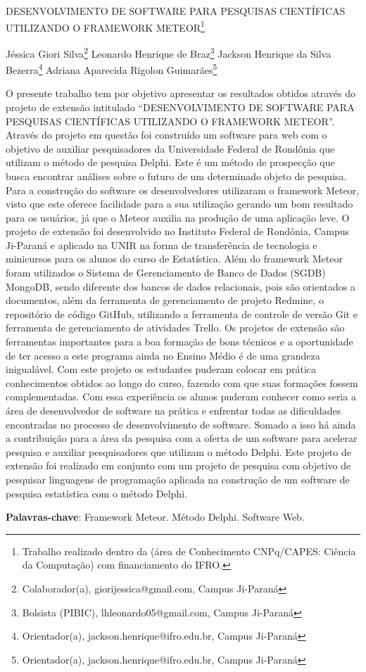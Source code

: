 \documentclass[article,12pt,onesidea,4paper,english,brazil]{abntex2}
\begin{document}
	
	
	\frenchspacing 
	
	\begin{center}
		\LARGE DESENVOLVIMENTO DE SOFTWARE PARA PESQUISAS CIENTÍFICAS UTILIZANDO O FRAMEWORK METEOR\footnote{Trabalho realizado dentro da (área de Conhecimento CNPq/CAPES: Ciência da Computação) com financiamento do IFRO.}
		
		\normalsize
		Jéssica Giori Silva\footnote{Colaborador(a), giorijessica@gmail.com, Campus Ji-Paraná} 
		Leonardo Henrique de Braz\footnote{Bolsista (PIBIC), lhleonardo05@gmail.com, Campus Ji-Paraná} 
		Jackson Henrique da Silva Bezerra\footnote{Orientador(a), jackson.henrique@ifro.edu.br, Campus Ji-Paraná} 
		Adriana Aparecida Rigolon Guimarães\footnote{Orientador(a), jackson.henrique@ifro.edu.br, Campus Ji-Paraná } 
	\end{center}
	
	\noindent O presente trabalho tem por objetivo apresentar os resultados obtidos através do projeto de extensão intitulado “DESENVOLVIMENTO DE SOFTWARE PARA PESQUISAS CIENTÍFICAS UTILIZANDO O FRAMEWORK METEOR”. Através do projeto em questão foi construído um software para web com o objetivo de auxiliar pesquisadores da Universidade Federal de Rondônia que utilizam o método de pesquisa Delphi. Este é um método de prospecção que busca encontrar análises sobre o futuro de um determinado objeto de pesquisa. Para a construção do software os desenvolvedores utilizaram o framework Meteor, visto que este oferece facilidade para a sua utilização gerando um bom resultado para os usuários, já que o Meteor auxilia na produção de uma aplicação leve. O projeto de extensão foi desenvolvido no Instituto Federal de Rondônia, Campus Ji-Paraná e aplicado na UNIR na forma de transferência de tecnologia e minicursos para os alunos do curso de Estatística. Além do framework Meteor foram utilizados o Sistema de Gerenciamento de Banco de Dados (SGDB) MongoDB, sendo diferente dos bancos de dados relacionais, pois são orientados a documentos, além da ferramenta de gerenciamento de projeto Redmine, o repositório de código GitHub, utilizando a ferramenta de controle de versão Git e ferramenta de gerenciamento de atividades Trello. Os projetos de extensão são ferramentas importantes para a boa formação de bons técnicos e a oportunidade de ter acesso a este programa ainda no Ensino Médio é de uma grandeza inigualável. Com este projeto os estudantes puderam colocar em prática conhecimentos obtidos ao longo do curso, fazendo com que suas formações fossem complementadas. Com essa experiência os alunos puderam conhecer como seria a área de desenvolvedor de software na prática e enfrentar todas as dificuldades encontradas no processo de desenvolvimento de software. Somado a isso há ainda a contribuição para a área da pesquisa com a oferta de um software para acelerar pesquisa e auxiliar pesquisadores que utilizam o método Delphi. Este projeto de extensão foi realizado em conjunto com um projeto de pesquisa com objetivo de pesquisar linguagens de programação aplicada na construção de um software de pesquisa estatística com o método Delphi.
	
	\vspace{\onelineskip}
	
	\noindent
	\textbf{Palavras-chave}: Framework Meteor. Método Delphi. Software Web.
	
\end{document}

